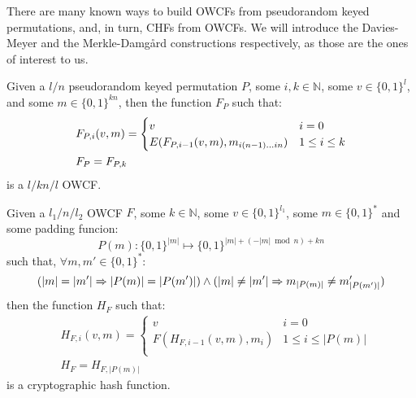 \noindent There are many known ways to build OWCFs from pseudorandom keyed
permutations, and, in turn, CHFs from OWCFs.
We will introduce the Davies-Meyer and the Merkle-Damg\r{a}rd constructions respectively, as
those are the ones of interest to us.
\begin{theorem}
	Given a \(l/n\) pseudorandom keyed permutation \(P\), some \(i, k \in \mathbb{N}\), some
	\(v \in {\{0, 1\}}^l\), and some \(m \in {\{0, 1\}}^{kn}\), then the function \(F_P\) such that:
	\begin{align*}
		 & F_{P,i}(v, m) =
		\begin{cases}
			v                                           & i = 0         \\
			E(F_{P, i-1}(v, m), m_{{{i(n-1)}\dots{in}}}) & 1 \le i \le k \\
		\end{cases} \\
		 & F_P = F_{P, k}
	\end{align*}
	is a \(l/kn/l\) OWCF\@.
\end{theorem}
\begin{theorem}
	Given a \(l_1/n/l_2\) OWCF \(F\), some \(k \in \mathbb{N}\), some \(v \in {\{0, 1\}}^{l_1}\),
	some \(m \in {\{0, 1\}}^*\) and some padding funcion:
	\[P(m)\colon {\{0, 1\}}^{|m|} \mapsto {\{0, 1\}}^{|m| + (-|m| \bmod n) + kn}\]
	such that, \(\forall m, m' \in {\{0, 1\}}^*\colon \)
	\[(|m| = |m'| \Rightarrow |P(m)| = |P(m')|) \land (|m| \neq |m'| \Rightarrow m_{|P(m)|} \neq m'_{|P(m')|})\]
	then the function \(H_F\) such that:
	\begin{align*}
		 & H_{F, i}(v, m) =
		\begin{cases}
			v                        & i = 0              \\
			F(H_{F, i-1}(v, m), m_i) & 1 \le i \le |P(m)| \\
		\end{cases} \\
		 & H_F = H_{F, |P(m)|}
	\end{align*}
	is a cryptographic hash function.
\end{theorem}
